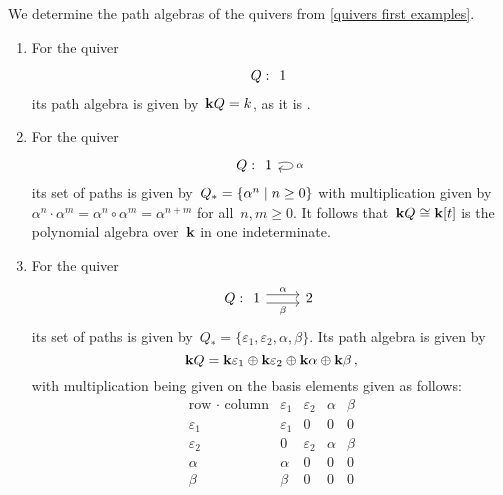 \begin{example}
  We determine the path algebras of the quivers from \cref{quivers first examples}.
  \begin{enumerate}
    \item
      For the quiver
      \[
        Q :
        \begin{tikzcd}
          1
        \end{tikzcd}
      \]
      its path algebra is given by~$\mathbf{k} Q = k$, as it is .
    \item
      For the quiver
      \[
        Q :
        \begin{tikzcd}
            1
            \arrow[loop right]{r}[right]{\alpha}
        \end{tikzcd}
      \]
      its set of paths is given by~$Q_* = \{ \alpha^n \suchthat n \geq 0 \}$ with multiplication given by~$\alpha^n \cdot \alpha^m = \alpha^n \circ \alpha^m = \alpha^{n+m}$ for all~$n, m \geq 0$.
      It follows that~$\mathbf{k} Q \cong \mathbf{k}[t]$ is the polynomial algebra over~$\mathbf{k}$ in one indeterminate.
    \item
      For the quiver
      \[
        Q :
        \begin{tikzcd}
            1
            \arrow[shift left = 0.3em]{r}[above]{\alpha}
            \arrow[shift right = 0.3em]{r}[below]{\beta}
          & 2
        \end{tikzcd}
      \]
      its set of paths is given by~$Q_* = \{ \varepsilon_1, \varepsilon_2, \alpha, \beta \}$.
      Its path algebra is given by
      \[
          \mathbf{k} Q
        = \mathbf{k} \varepsilon_1 \oplus \mathbf{k} \varepsilon_2 \oplus \mathbf{k} \alpha \oplus \mathbf{k} \beta \,,
      \]
      with multiplication being given on the basis elements given as follows:
      \[
        \begin{array}{r|cccc}
            \text{row $\cdot$ column}
          & \varepsilon_1
          & \varepsilon_2
          & \alpha
          & \beta
          \\
          \hline
            \varepsilon_1
          & \varepsilon_1
          & 0
          & 0
          & 0
          \\
            \varepsilon_2
          & 0
          & \varepsilon_2
          & \alpha
          & \beta
          \\
            \alpha
          & \alpha
          & 0
          & 0
          & 0
          \\
            \beta
          & \beta
          & 0
          & 0
          & 0
        \end{array}
      \]

  \end{enumerate}
\end{example}


